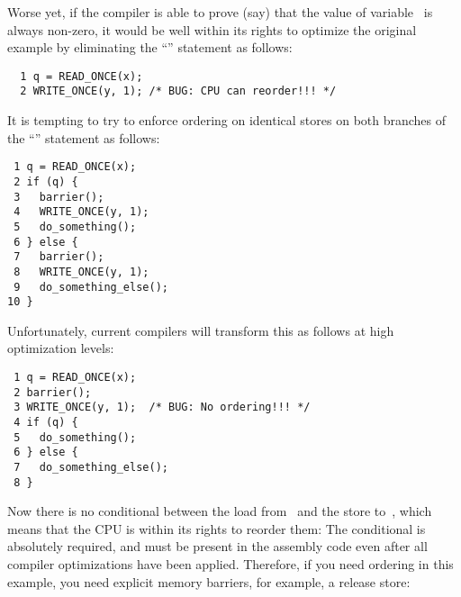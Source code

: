 Worse yet, if the compiler is able to prove (say) that the value of
variable~ is always non-zero, it would be well within its rights
to optimize the original example by eliminating the ``'' statement
as follows:

\vspace{5pt}
\begin{minipage}[t]{\columnwidth}
\scriptsize
\begin{verbatim}
  1 q = READ_ONCE(x);
  2 WRITE_ONCE(y, 1); /* BUG: CPU can reorder!!! */
\end{verbatim}
\end{minipage}
\vspace{5pt}

It is tempting to try to enforce ordering on identical stores on both
branches of the ``'' statement as follows:

\vspace{5pt}
\begin{minipage}[t]{\columnwidth}
\scriptsize
\begin{verbatim}
 1 q = READ_ONCE(x);
 2 if (q) {
 3   barrier();
 4   WRITE_ONCE(y, 1);
 5   do_something();
 6 } else {
 7   barrier();
 8   WRITE_ONCE(y, 1);
 9   do_something_else();
10 }
\end{verbatim}
\end{minipage}
\vspace{5pt}

Unfortunately, current compilers will transform this as follows at high
optimization levels:

\vspace{5pt}
\begin{minipage}[t]{\columnwidth}
\scriptsize
\begin{verbatim}
 1 q = READ_ONCE(x);
 2 barrier();
 3 WRITE_ONCE(y, 1);  /* BUG: No ordering!!! */
 4 if (q) {
 5   do_something();
 6 } else {
 7   do_something_else();
 8 }
\end{verbatim}
\end{minipage}
\vspace{5pt}

Now there is no conditional between the load from~ and the store
to~, which means that the CPU is within its rights to reorder them:
The conditional is absolutely required, and must be present in the
assembly code even after all compiler optimizations have been applied.
Therefore, if you need ordering in this example, you need explicit
memory barriers, for example, a release store:

